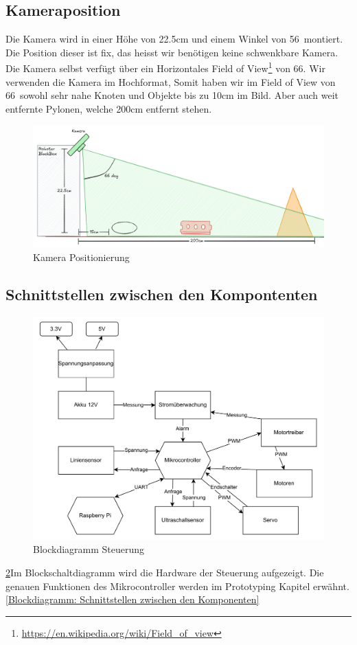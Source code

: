 \subsection{Kameraposition}

Die Kamera wird in einer Höhe von 22.5cm und einem Winkel von 56\textdegree\ montiert. Die Position dieser ist fix, das heisst wir benötigen keine schwenkbare Kamera.
Die Kamera selbst verfügt über ein Horizontales Field of View\footnote{\url{https://en.wikipedia.org/wiki/Field_of_view}} von 66\textdegree. Wir verwenden die Kamera im Hochformat, Somit haben wir im Field of View von 66\textdegree\ sowohl sehr nahe Knoten und Objekte bis zu 10cm im Bild. Aber auch weit entfernte Pylonen, welche 200cm entfernt stehen.

\begin{figure}[H]
    \centering
    \includegraphics[width=1\linewidth]{assets//informatik-prototyp//camera/camera_position.png}
    \caption{Kamera Positionierung}
    \label{fig:camera-position-concept}
\end{figure}





\subsection{Schnittstellen zwischen den Kompontenten}




\begin{figure}[H]
    \centering
    \includegraphics[width=1\linewidth]{img/Blockdiagramm_Elektrotechnik.pdf}
    \caption{Blockdiagramm Steuerung}
    \label{Blockdiagramm Steuerung}
\end{figure}

\ref{Blockdiagramm Steuerung}Im Blockschaltdiagramm wird die Hardware der Steuerung aufgezeigt. Die genauen Funktionen des Mikrocontroller werden im Prototyping Kapitel erwähnt. \ref{Blockdiagramm: Schnittstellen zwischen den Komponenten}
